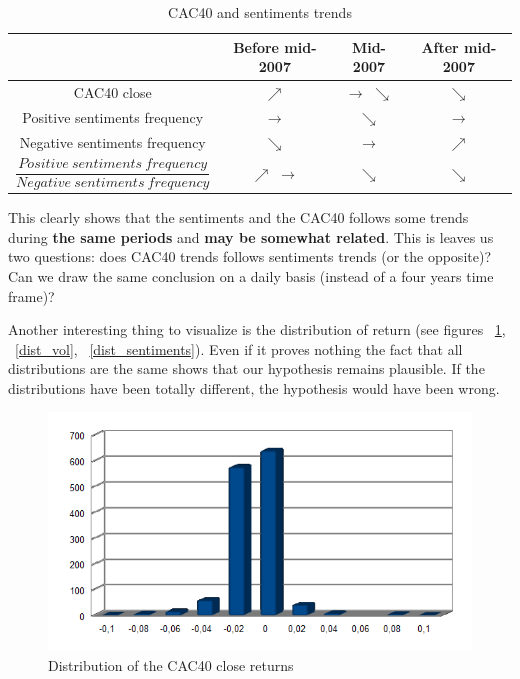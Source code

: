 \documentclass[12pt]{report}
\begin{document}
			\begin{center}
			\begin{table}
			\begin{tabular}{|c | c | c | c|}
				\hline
				& Before mid-2007 & Mid-2007 & After mid-2007\\
				\hline
				CAC40 close & $\nearrow$ & $\rightarrow$ $\searrow$ & $\searrow$\\
				\hline
				Positive sentiments frequency & $\rightarrow$ & $\searrow$ & $\rightarrow$\\
				\hline
				Negative sentiments frequency & $\searrow$ & $\rightarrow$ & $\nearrow$\\
				\hline
				$\dfrac{Positive\ sentiments\ frequency}{Negative\ sentiments\ frequency}$ & $\nearrow$ $\rightarrow$ & $\searrow$ & $\searrow$\\
				\hline
			\end{tabular}
			\caption{CAC40 and sentiments trends\label{trends}}
			\end{table}
			\end{center}
			
			This clearly shows that the sentiments and the CAC40 follows some trends during \textbf{the same periods} and \textbf{may be somewhat related}. This is leaves us two questions: does CAC40 trends follows sentiments trends (or the opposite)? Can we draw the same conclusion on a daily basis (instead of a four years time frame)?
			
			Another interesting thing to visualize is the distribution of return (see figures ~\ref{dist_cac}, ~\ref{dist_vol}, ~\ref{dist_sentiments}). Even if it proves nothing the fact that all distributions are the same shows that our hypothesis remains plausible. If the distributions have been totally different, the hypothesis would have been wrong.

			\begin{figure}[H]
				\caption{Distribution of the CAC40 close returns\label{dist_cac}}
				\includegraphics{plots/dists/close_return.png}
			\end{figure}
\end{document}
